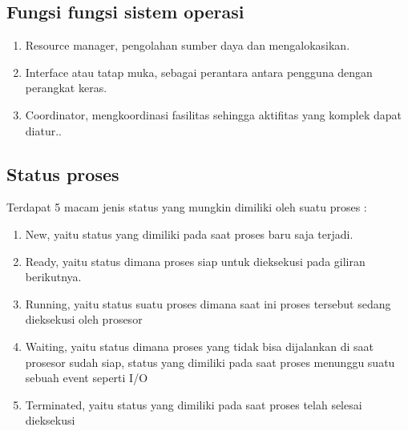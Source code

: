 	\subsection{Fungsi fungsi sistem operasi}
		\begin{enumerate}
			\item Resource manager, pengolahan sumber daya dan mengalokasikan.
			\item Interface atau tatap muka, sebagai perantara antara pengguna dengan perangkat keras.
			\item Coordinator, mengkoordinasi fasilitas sehingga aktifitas yang komplek dapat diatur..
		\end{enumerate}
		
	\subsection{Status proses}
	Terdapat 5 macam jenis status yang mungkin dimiliki oleh suatu proses :
	\begin{enumerate}
		\item New, yaitu status yang dimiliki pada saat proses baru saja terjadi.
		\item Ready, yaitu status dimana proses siap untuk dieksekusi pada giliran berikutnya.
		\item Running, yaitu status suatu proses dimana saat ini proses tersebut sedang dieksekusi oleh prosesor
		\item Waiting, yaitu status dimana proses yang tidak bisa dijalankan di saat prosesor sudah siap, status yang dimiliki pada saat proses menunggu suatu sebuah event seperti I/O
		\item Terminated, yaitu status yang dimiliki pada saat proses telah selesai dieksekusi
	\end{enumerate}
	
